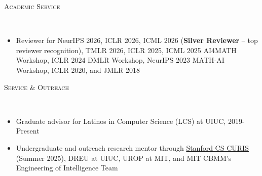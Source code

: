 \documentclass{article}
\newenvironment{changemargin}[2]{%
  \begin{list}{}{%
    \setlength{\topsep}{0pt}%
    \setlength{\leftmargin}{#1}%
    \setlength{\rightmargin}{#2}%
    \setlength{\listparindent}{\parindent}%
    \setlength{\itemindent}{\parindent}%
    \setlength{\parsep}{\parskip}%
  }%
  \item[]}{\end{list}
}
\newcommand{\lineover}{
	\begin{changemargin}{-0.05in}{-0.05in}
		\vspace*{-8pt}
		\hrulefill \\
		\vspace*{-2pt}
	\end{changemargin}
}
\newcommand{\header}[1]{
	\begin{changemargin}{-0.5in}{-0.5in}
		\scshape{#1}\\
  	\lineover
	\end{changemargin}
	\nopagebreak[4]    %
}
\newenvironment{body} {
		\vspace*{-16pt}
		\begin{changemargin}{-0.25in}{-0.5in}
	  }
		{\end{changemargin}\vspace{8pt plus 12pt}
	}
\begin{document}

\header{Academic Service}

\begin{body}

\vspace{12pt}
\begin{itemize} \itemsep -2pt
    \item Reviewer for NeurIPS 2026, ICLR 2026, ICML 2026 (\textbf{Silver Reviewer} -- top reviewer recognition), TMLR 2026, ICLR 2025, ICML 2025 AI4MATH Workshop, ICLR 2024 DMLR Workshop, NeurIPS 2023 MATH-AI Workshop, ICLR 2020, and JMLR 2018
\end{itemize}

\end{body}


\header{Service \& Outreach}

\begin{body}

\vspace{12pt}
\begin{itemize} \itemsep -2pt
    \item Graduate advisor for Latinos in Computer Science (LCS) at UIUC, 2019-Present
    \item Undergraduate and outreach research mentor through \href{https://www.cs.stanford.edu/bachelors/research-opportunities}{Stanford CS CURIS} (Summer 2025), DREU at UIUC, UROP at MIT, and MIT CBMM's Engineering of Intelligence Team
\end{itemize}

\end{body}

\end{document}
